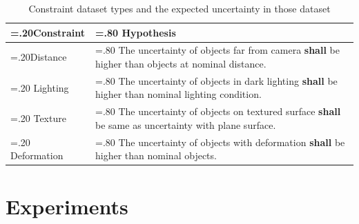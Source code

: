 
\begin{table}[b]
	\centering
\begin{tabularx}{\textwidth} { 
	|>{\hsize=.20\hsize}X
	|| >{\hsize=.80\hsize}X| }
	\hline
	\textbf{Constraint}  & \textbf{Hypothesis} \\
	\hline
	Distance  & The uncertainty of objects far from camera  \textbf{shall} be higher than objects at nominal distance. \\
	\hline
	Lighting  & The uncertainty of objects in dark lighting  \textbf{shall} be higher than nominal lighting condition. \\
	\hline
	Texture & The uncertainty of objects on textured surface \textbf{shall} be same as uncertainty with plane surface. \\
	\hline 
	Deformation & The uncertainty of objects with deformation \textbf{shall} be higher than nominal objects. \\
	\hline
\end{tabularx}
 \caption{Constraint dataset types and the expected uncertainty in those dataset}
\label{table:constraints_table}
\end{table}
\hypertarget{experiments}{%
\section{Experiments}\label{experiments}}

